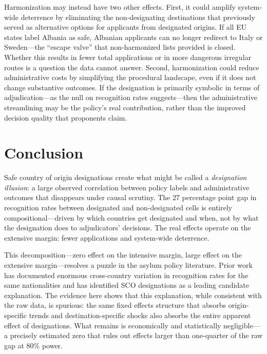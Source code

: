 \documentclass[12pt]{article}
\begin{document}
Harmonization may instead have two other effects. First, it could amplify system-wide deterrence by eliminating the non-designating destinations that previously served as alternative options for applicants from designated origins. If all EU states label Albania as safe, Albanian applicants can no longer redirect to Italy or Sweden---the ``escape valve'' that non-harmonized lists provided is closed. Whether this results in fewer total applications or in more dangerous irregular routes is a question the data cannot answer. Second, harmonization could reduce administrative costs by simplifying the procedural landscape, even if it does not change substantive outcomes. If the designation is primarily symbolic in terms of adjudication---as the null on recognition rates suggests---then the administrative streamlining may be the policy's real contribution, rather than the improved decision quality that proponents claim.

\section{Conclusion}

Safe country of origin designations create what might be called a \textit{designation illusion}: a large observed correlation between policy labels and administrative outcomes that disappears under causal scrutiny. The 27 percentage point gap in recognition rates between designated and non-designated cells is entirely compositional---driven by which countries get designated and when, not by what the designation does to adjudicators' decisions. The real effects operate on the extensive margin: fewer applications and system-wide deterrence.

This decomposition---zero effect on the intensive margin, large effect on the extensive margin---resolves a puzzle in the asylum policy literature. Prior work has documented enormous cross-country variation in recognition rates for the same nationalities and has identified SCO designations as a leading candidate explanation. The evidence here shows that this explanation, while consistent with the raw data, is spurious: the same fixed effects structure that absorbs origin-specific trends and destination-specific shocks also absorbs the entire apparent effect of designations. What remains is economically and statistically negligible---a precisely estimated zero that rules out effects larger than one-quarter of the raw gap at 80\% power.
\end{document}
